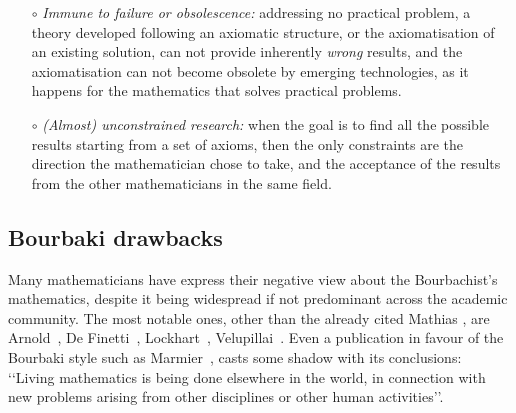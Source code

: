 \documentclass[]{scrartcl}
\theoremstyle{definition}
\begin{document}
\begin{itemize}
    \item[$\circ$] \emph{Immune to failure or obsolescence:} addressing no practical problem, a theory developed following an axiomatic structure, or the axiomatisation of an existing solution, can not provide inherently \emph{wrong} results, and the axiomatisation can not become obsolete by emerging technologies, as it happens for the mathematics that solves practical problems.
    
    \item[$\circ$] \emph{(Almost) unconstrained research:} when the goal is to find all the possible results starting from a set of axioms, then the only constraints are the direction the mathematician chose to take, and the acceptance of the results from the other mathematicians in the same field.
     
\end{itemize}

\subsection*{Bourbaki drawbacks}

Many mathematicians have express their negative view about the Bourbachist's mathematics, despite it being widespread if not predominant across the academic community. The most notable ones, other than the already cited Mathias \cite{mathias1992ignorance}, are Arnold~\cite{arnol1998teaching}, De Finetti~\cite{de2008bruno}, Lockhart~\cite{lockhart2009mathematician}, Velupillai~\cite{velupillai2012bourbaki}. Even a publication in favour of the Bourbaki style such as Marmier~\cite{marmier2014idea}, casts some shadow with its conclusions: \lq\lq Living mathematics is being done elsewhere in the world, in connection with new problems arising from other disciplines or other human activities\rq\rq.
\end{document}
